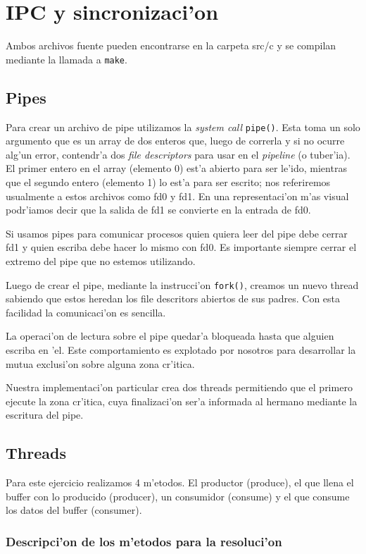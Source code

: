 \section{IPC y sincronizaci'on}
Ambos archivos fuente pueden encontrarse en la carpeta src/c y se compilan mediante la llamada a \texttt{make}.
\subsection{Pipes}
Para crear un archivo de pipe utilizamos la \textit{system call} \texttt{pipe()}. Esta toma un solo argumento que es un array de dos enteros que, luego de correrla y si no ocurre alg'un error, contendr'a dos \textit{file descriptors} para usar en el \textit{pipeline} (o tuber'ia). El primer entero en el array (elemento 0) est'a abierto para ser le'ido, mientras que el segundo entero (elemento 1) lo est'a para ser escrito; nos referiremos usualmente a estos archivos como fd0 y fd1. En una representaci'on m'as visual podr'iamos decir que la salida de fd1 se convierte en la entrada de fd0.

Si usamos pipes para comunicar procesos quien quiera leer del pipe debe cerrar fd1 y quien escriba debe hacer lo mismo con fd0. Es importante siempre cerrar el extremo del pipe que no estemos utilizando.

Luego de crear el pipe, mediante la instrucci'on \texttt{fork()}, creamos un nuevo thread sabiendo que estos heredan los file descritors abiertos de sus padres. Con esta facilidad la comunicaci'on es sencilla.

La operaci'on de lectura sobre el pipe quedar'a bloqueada hasta que alguien escriba en 'el. Este comportamiento es explotado por nosotros para desarrollar la mutua exclusi'on sobre alguna zona cr'itica.

Nuestra implementaci'on particular crea dos threads permitiendo que el primero ejecute la zona cr'itica, cuya finalizaci'on ser'a informada al hermano mediante la escritura del pipe. 


\subsection{Threads}
Para este ejercicio realizamos 4 m'etodos. El productor (produce), el que llena el buffer con lo producido (producer), un consumidor (consume) y el que consume los datos del buffer (consumer).

\subsubsection{Descripci'on de los m'etodos para la resoluci'on}

